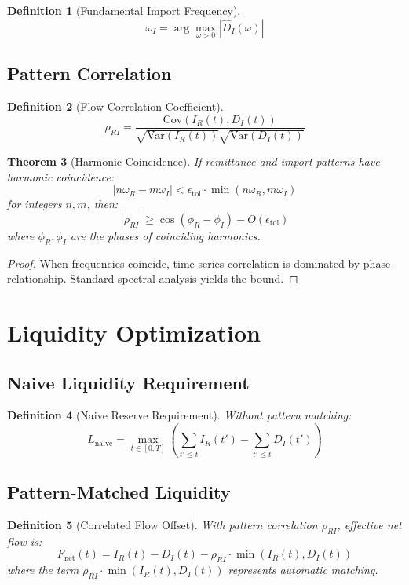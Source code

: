 \documentclass[12pt]{article}
\newtheorem{theorem}{Theorem}
\newtheorem{definition}[theorem]{Definition}
\begin{document}
\begin{definition}[Fundamental Import Frequency]
$$
\omega_I = \arg\max_{\omega > 0} |\hat{D}_I(\omega)|
$$
\end{definition}

\subsection{Pattern Correlation}

\begin{definition}[Flow Correlation Coefficient]
$$
\rho_{RI} = \frac{\text{Cov}(I_R(t), D_I(t))}{\sqrt{\text{Var}(I_R(t))}\sqrt{\text{Var}(D_I(t))}}
$$
\end{definition}

\begin{theorem}[Harmonic Coincidence]
If remittance and import patterns have harmonic coincidence:
$$
|n\omega_R - m\omega_I| < \epsilon_{\text{tol}} \cdot \min(n\omega_R, m\omega_I)
$$
for integers $n,m$, then:
$$
|\rho_{RI}| \geq \cos(\phi_R - \phi_I) - O(\epsilon_{\text{tol}})
$$
where $\phi_R, \phi_I$ are the phases of coinciding harmonics.
\end{theorem}

\begin{proof}
When frequencies coincide, time series correlation is dominated by phase relationship. Standard spectral analysis yields the bound.
\end{proof}

\section{Liquidity Optimization}

\subsection{Naive Liquidity Requirement}

\begin{definition}[Naive Reserve Requirement]
Without pattern matching:
$$
L_{\text{naive}} = \max_{t \in [0,T]} \left(\sum_{t' \leq t} I_R(t') - \sum_{t' \leq t} D_I(t')\right)
$$
\end{definition}

\subsection{Pattern-Matched Liquidity}

\begin{definition}[Correlated Flow Offset]
With pattern correlation $\rho_{RI}$, effective net flow is:
$$
F_{\text{net}}(t) = I_R(t) - D_I(t) - \rho_{RI} \cdot \min(I_R(t), D_I(t))
$$
where the term $\rho_{RI} \cdot \min(I_R(t), D_I(t))$ represents automatic matching.
\end{definition}
\end{document}
